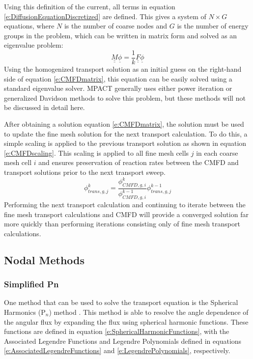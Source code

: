Using this definition of the current, all terms in equation \ref{e:DiffusionEquationDiscretized} are defined.  This gives a system of $N\times G$ equations, where $N$ is the number of coarse nodes and $G$ is the number of energy groups in the problem, which can be written in matrix form and solved as an eigenvalue problem:
\begin{equation}\label{e:CMFDmatrix}
\underline{\underline{M}}\underline{\phi}=\frac{1}{k}\underline{\underline{F}}\underline{\phi}
\end{equation}
Using the homogenized transport solution as an initial guess on the right-hand side of equation \ref{e:CMFDmatrix}, this equation can be easily solved using a standard eigenvalue solver.  MPACT generally uses either power iteration or generalized Davidson methods to solve this problem, but these methods will not be discussed in detail here.

After obtaining a solution equation \ref{e:CMFDmatrix}, the solution must be used to update the fine mesh solution for the next transport calculation.  To do this, a simple scaling is applied to the previous transport solution as shown in equation \ref{e:CMFDscaling}.  This scaling is applied to all fine mesh cells $j$ in each coarse mesh cell $i$ and ensures preservation of reaction rates between the CMFD and transport solutions prior to the next transport sweep.
\begin{equation}\label{e:CMFDscaling}
\phi_{trans,g,j}^{k}=\frac{\phi_{CMFD,g,i}^k}{\phi_{CMFD,g,i}^{k-1}}\phi_{trans,g,j}^{k-1}
\end{equation}
Performing the next transport calculation and continuing to iterate between the fine mesh transport calculations and CMFD will provide a converged solution far more quickly than performing iterations consisting only of fine mesh transport calculations.

\subsection{Nodal Methods}

\subsubsection{Simplified Pn}

One method that can be used to solve the transport equation is the Spherical Harmonics (P$_n$) method \cite{SPnEquations}.  This method is able to resolve the angle dependence of the angular flux by expanding the flux using spherical harmonic functions.  These functions are defined in equation \ref{e:SphericalHarmonicFunctions}, with the Associated Legendre Functions and Legendre Polynomials defined in equations \ref{e:AssociatedLegendreFunctions} and \ref{e:LegendrePolynomials}, respectively.


